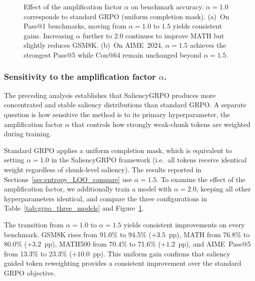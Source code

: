 \documentclass[12pt]{report}
\begin{document}
\begin{figure}[t]
\begin{subfigure}[t]{0.48\textwidth}
\end{subfigure}
\caption{Effect of the amplification factor $\alpha$ on benchmark
  accuracy.  $\alpha = 1.0$ corresponds to standard GRPO
  (uniform completion mask).  (a)~On Pass@1 benchmarks, moving from
  $\alpha = 1.0$ to $1.5$ yields consistent gains. Increasing $\alpha$ further to $2.0$ continues to improve MATH but slightly reduces GSM8K.
  (b)~On AIME~2024, $\alpha = 1.5$ achieves the strongest Pass@5
  while Con@64 remain unchanged beyond $\alpha = 1.5$.}
\label{fig:alpha-ablation}
\end{figure}

\subsubsection{Sensitivity to the amplification factor $\alpha$.}

The preceding analysis establishes that SaliencyGRPO produces more concentrated and stable saliency distributions than standard GRPO. 
A separate question is how sensitive the method is to its primary hyperparameter, the amplification factor $\alpha$ that controls how strongly weak-chunk tokens are weighted during training.

Standard GRPO applies a uniform completion mask, which is equivalent to
setting $\alpha = 1.0$ in the SaliencyGRPO framework (i.e.\ all tokens
receive identical weight regardless of chunk-level saliency).
The results reported in Sections~\ref{sec:entropy_LOO_compare} use $\alpha = 1.5$.
To examine the effect of the amplification factor, we additionally
train a model with $\alpha = 2.0$, keeping all other hyperparameters
identical, and compare the three configurations in Table~\ref{tab:grpo_three_models} and Figure~\ref{fig:alpha-ablation}.

The transition from $\alpha = 1.0$ to $\alpha = 1.5$ yields consistent
improvements on every benchmark. GSM8K rises from 91.0\% to 94.5\%
($+3.5$~pp), MATH from 76.8\% to 80.0\% ($+3.2$~pp), MATH500
from 70.4\% to 71.6\% ($+1.2$~pp), and AIME~Pass@5 from 13.3\% to
23.3\% ($+10.0$~pp).  This uniform gain confirms that saliency guided
token reweighting provides a consistent improvement over the
standard GRPO objective.
\end{document}
